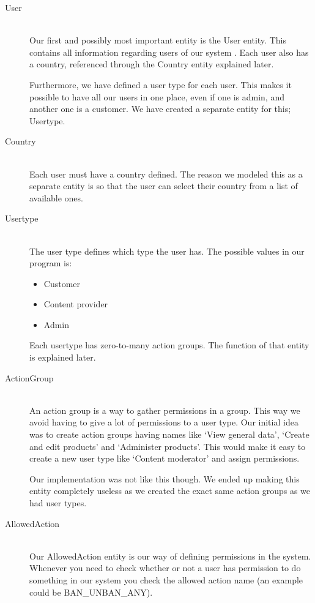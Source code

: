 \begin{description}
\item[User] \hfill \\
Our first and possibly most important entity is the User entity. This contains all information regarding users of our system . Each user also has a country, referenced through the Country entity explained later.

Furthermore, we have defined a user type for each user. This makes it possible to have all our users in one place, even if one is admin, and another one is a customer. We have created a separate entity for this; Usertype.

\item[Country] \hfill \\
Each user must have a country defined. The reason we modeled this as a separate entity is so that the user can select their country from a list of available ones.

\item[Usertype] \hfill \\
The user type defines which type the user has. The possible values in our program is:
\begin{itemize}
	\item Customer
	\item Content provider
	\item Admin
\end{itemize}

Each usertype has zero-to-many action groups. The function of that entity is explained later.

\item[ActionGroup] \hfill \\
An action group is a way to gather permissions in a group. This way we avoid having to give a lot of permissions to a user type. Our initial idea was to create action groups having names like `View general data', `Create and edit products' and `Administer products'. This would make it easy to create a new user type like `Content moderator' and assign permissions.

Our implementation was not like this though. We ended up making this entity completely useless as we created the exact same action groups as we had user types.

\item[AllowedAction] \hfill \\
Our AllowedAction entity is our way of defining permissions in the system. Whenever you need to check whether or not a user has permission to do something in our system you check the allowed action name (an example could be BAN\_UNBAN\_ANY).


\end{description}
